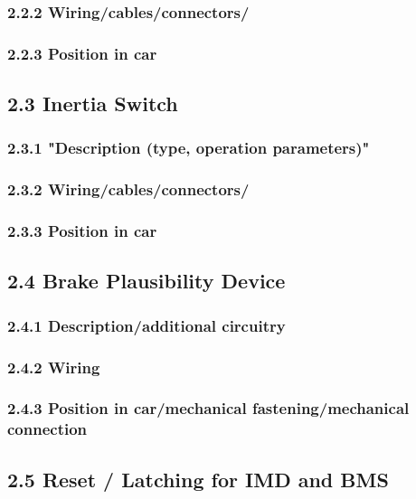 \documentclass{article}
\begin{document}
\subsubsection*{2.2.2 Wiring/cables/connectors/}

\subsubsection*{2.2.3 Position in car}

\subsection*{2.3 Inertia Switch}

\subsubsection*{2.3.1 "Description (type, operation parameters)"}

\subsubsection*{2.3.2 Wiring/cables/connectors/}

\subsubsection*{2.3.3 Position in car}

\subsection*{2.4 Brake Plausibility Device}

\subsubsection*{2.4.1 Description/additional circuitry}

\subsubsection*{2.4.2 Wiring}

\subsubsection*{2.4.3 Position in car/mechanical fastening/mechanical connection}

\subsection*{2.5 Reset / Latching for IMD and BMS}
\end{document}
